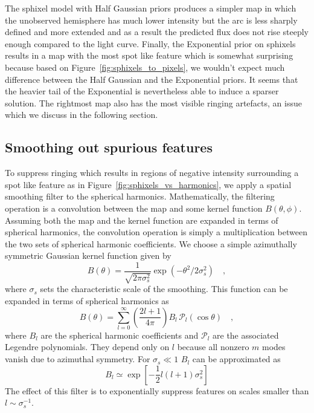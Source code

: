 \documentclass[modern]{aastex62}
\begin{document}
The sphixel model with Half Gaussian priors produces a simpler map in which the unobserved hemisphere has much lower intensity but the arc is less sharply defined and more extended and as a result the predicted flux does not rise steeply enough compared to the light curve.
Finally, the Exponential prior on sphixels results in a map with the most spot like feature 
which is somewhat surprising because based on Figure~\ref{fig:sphixels_to_pixels}, we wouldn't expect much difference between the Half Gaussian and the Exponential priors.
It seems that the heavier tail of the Exponential is nevertheless able to induce a sparser solution.
The rightmost map also has the most visible ringing artefacts, an issue which we discuss in the following section.

\subsection{Smoothing out spurious features}
\label{ssec:spurious_features}
To suppress ringing which results in regions of negative intensity surrounding a spot like feature as in Figure~\ref{fig:sphixels_vs_harmonics}, we apply a spatial smoothing filter to the spherical harmonics.
Mathematically, the filtering operation is a convolution between the map and some kernel function $B(\theta,\phi)$.
Assuming both the map and the kernel function are expanded in terms of spherical harmonics, the convolution operation is simply a multiplication between the two sets of spherical harmonic coefficients.
We choose a simple azimuthally symmetric Gaussian kernel function given by
\begin{equation}
    B(\theta)=\frac{1}{\sqrt{2 \pi \sigma_s^{2}}}\exp \left(-\theta^{2} / 2 \sigma_s^{2}\right)
    \quad,
\end{equation}
where $\sigma_s$ sets the characteristic scale of the smoothing.
This function can be expanded in terms of spherical harmonics as
\begin{equation}
    B(\theta)=\sum_{l=0}^{\infty}\left(\frac{2 l+1}{4 \pi}\right) B_{l} \,\mathcal{P}_{l}(\cos \theta)
    \quad,
\end{equation}
where $B_l$ are the spherical harmonic coefficients and $\mathcal{P}_l$ are the associated Legendre polynomials.
They depend only on $l$ because all nonzero $m$ modes vanish due to azimuthal symmetry.
For $\sigma_s\ll 1$ $B_l$ can be approximated as \citep{seon2007,white1995}
\begin{equation}
    B_l\simeq \exp\left[-\frac{1}{2}l(l+1)\sigma_s^2\right]
\end{equation}
The effect of this filter is to exponentially suppress features on scales smaller than $l\sim \sigma_s^{-1}$.
\end{document}
